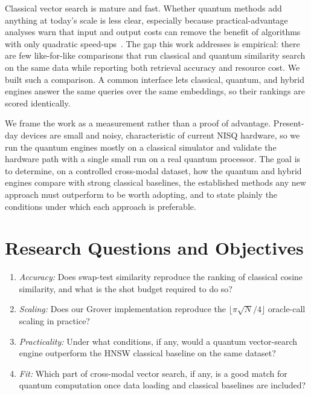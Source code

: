 
Classical vector search is mature and fast. Whether quantum methods add anything
at today's scale is less clear, especially because practical-advantage analyses
warn that input and output costs can remove the benefit of algorithms with only
quadratic speed-ups~\cite{hoefler2023practicality}. The gap this work addresses
is empirical: there are few like-for-like comparisons that run classical and
quantum similarity search on the same data while reporting both retrieval
accuracy and resource cost. We built such a comparison. A common interface lets
classical, quantum, and hybrid engines answer the same queries over the same
embeddings, so their rankings are scored identically.

We frame the work as a measurement rather than a proof of advantage. Present-day
devices are small and noisy, characteristic of current NISQ hardware, so we run
the quantum engines mostly on a classical simulator and validate the hardware
path with a single small run on a real quantum processor. The goal is to
determine, on a controlled cross-modal dataset, how the quantum and hybrid
engines compare with strong classical baselines, the established methods any new
approach must outperform to be worth adopting, and to state plainly the
conditions under which each approach is preferable.

\section{Research Questions and Objectives}
\label{sec:questions}


\begin{enumerate}[label=RQ\arabic*., leftmargin=*]
  \item \emph{Accuracy:} Does swap-test similarity reproduce the ranking of
        classical cosine similarity, and what is the shot budget required to do so?
  \item \emph{Scaling:} Does our Grover implementation reproduce the
        $\lfloor \pi\sqrt{N}/4 \rfloor$ oracle-call scaling in practice?
  \item \emph{Practicality:} Under what conditions, if any, would a
        quantum vector-search engine outperform the HNSW classical baseline on
        the same dataset?
  \item \emph{Fit:} Which part of cross-modal vector search, if any, is a good
        match for quantum computation once data loading and classical baselines
        are included?
\end{enumerate}

